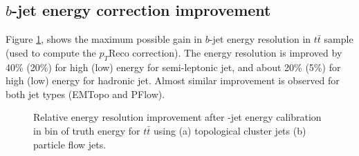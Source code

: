 \subsection{$b$-jet energy correction improvement}
\label{Jet:Cal:BCal:Result}
Figure \ref{fig:Jet:Cal:BCal:Result:E}, shows the maximum possible gain in $b$-jet energy resolution in $t\bar{t}$ sample (used to compute the $p_{T}$Reco correction). The energy resolution is improved by 40\% (20\%) for high (low) energy for semi-leptonic jet, and about 20\% (5\%) for high (low) energy for hadronic jet. Almost similar improvement is observed for both jet types (EMTopo and PFlow).
\begin{figure}[htbp]
   \centering
   \quad
   \caption{Relative energy resolution improvement after \bq-jet energy calibration in bin of truth energy for $t\bar{t}$ using (a) topological cluster jets (b) particle flow jets.}
   \label{fig:Jet:Cal:BCal:Result:E}
\end{figure}

